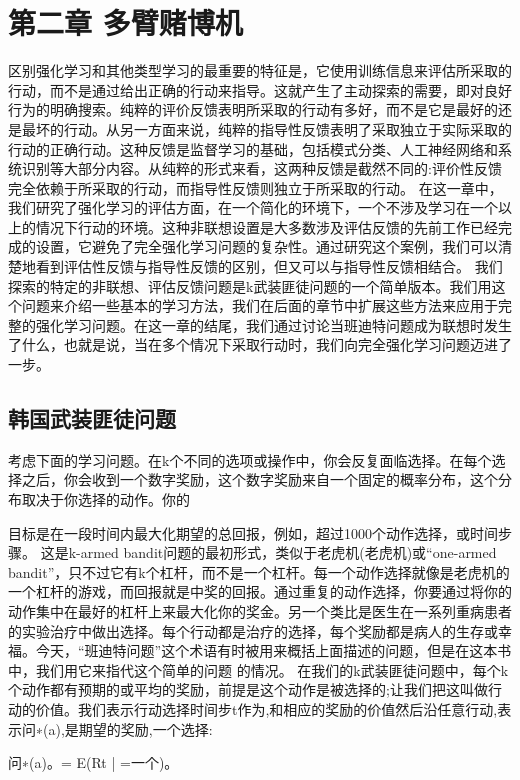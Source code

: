 
\chapter{第二章 多臂赌博机}

区别强化学习和其他类型学习的最重要的特征是，它使用训练信息来评估所采取的行动，而不是通过给出正确的行动来指导。这就产生了主动探索的需要，即对良好行为的明确搜索。纯粹的评价反馈表明所采取的行动有多好，而不是它是最好的还是最坏的行动。从另一方面来说，纯粹的指导性反馈表明了采取独立于实际采取的行动的正确行动。这种反馈是监督学习的基础，包括模式分类、人工神经网络和系统识别等大部分内容。从纯粹的形式来看，这两种反馈是截然不同的:评价性反馈完全依赖于所采取的行动，而指导性反馈则独立于所采取的行动。
在这一章中，我们研究了强化学习的评估方面，在一个简化的环境下，一个不涉及学习在一个以上的情况下行动的环境。这种非联想设置是大多数涉及评估反馈的先前工作已经完成的设置，它避免了完全强化学习问题的复杂性。通过研究这个案例，我们可以清楚地看到评估性反馈与指导性反馈的区别，但又可以与指导性反馈相结合。
我们探索的特定的非联想、评估反馈问题是k武装匪徒问题的一个简单版本。我们用这个问题来介绍一些基本的学习方法，我们在后面的章节中扩展这些方法来应用于完整的强化学习问题。在这一章的结尾，我们通过讨论当班迪特问题成为联想时发生了什么，也就是说，当在多个情况下采取行动时，我们向完全强化学习问题迈进了一步。

\section{韩国武装匪徒问题}

考虑下面的学习问题。在k个不同的选项或操作中，你会反复面临选择。在每个选择之后，你会收到一个数字奖励，这个数字奖励来自一个固定的概率分布，这个分布取决于你选择的动作。你的

目标是在一段时间内最大化期望的总回报，例如，超过1000个动作选择，或时间步骤。
这是k-armed bandit问题的最初形式，类似于老虎机(老虎机)或“one-armed bandit”，只不过它有k个杠杆，而不是一个杠杆。每一个动作选择就像是老虎机的一个杠杆的游戏，而回报就是中奖的回报。通过重复的动作选择，你要通过将你的动作集中在最好的杠杆上来最大化你的奖金。另一个类比是医生在一系列重病患者的实验治疗中做出选择。每个行动都是治疗的选择，每个奖励都是病人的生存或幸福。今天，“班迪特问题”这个术语有时被用来概括上面描述的问题，但是在这本书中，我们用它来指代这个简单的问题
的情况。
在我们的k武装匪徒问题中，每个k个动作都有预期的或平均的奖励，前提是这个动作是被选择的;让我们把这叫做行动的价值。我们表示行动选择时间步t作为,和相应的奖励的价值然后沿任意行动,表示问∗(a),是期望的奖励,一个选择:

问∗(a)。= E(Rt | =一个)。

